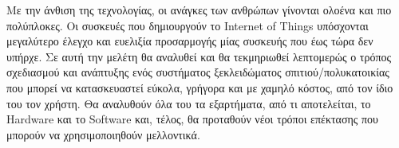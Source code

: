 Με την άνθιση της τεχνολογίας, οι ανάγκες των ανθρώπων γίνονται ολοένα και πιο πολύπλοκες. Οι συσκευές που δημιουργούν το Internet of Things υπόσχονται μεγαλύτερο έλεγχο και ευελιξία προσαρμογής μίας συσκευής που έως τώρα δεν υπήρχε. Σε αυτή την μελέτη θα αναλυθεί και θα τεκμηριωθεί λεπτομερώς ο τρόπος σχεδιασμού και ανάπτυξης ενός συστήματος ξεκλειδώματος σπιτιού/πολυκατοικίας που μπορεί να κατασκευαστεί εύκολα, γρήγορα και με χαμηλό κόστος, από τον ίδιο του τον χρήστη. Θα αναλυθούν όλα του τα εξαρτήματα, από τι αποτελείται, το Hardware και το Software και, τέλος, θα προταθούν νέοι τρόποι επέκτασης που μπορούν να χρησιμοποιηθούν μελλοντικά.